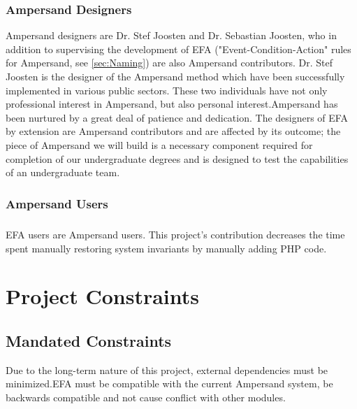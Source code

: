 \documentclass[12pt]{report}
\begin{document}
\subsection{Ampersand Designers}\label{subsec:Ampersand}
Ampersand designers are Dr. Stef Joosten and Dr. Sebastian Joosten, who in
addition to supervising the development of EFA ("Event-Condition-Action" rules
for Ampersand, see \ref{sec:Naming}) are also Ampersand
contributors.
Dr. Stef Joosten is the designer of the Ampersand method which
have been successfully implemented in various public sectors. These two 
individuals have not only professional interest in Ampersand, but also personal 
interest.Ampersand has been nurtured by a great deal of patience and
dedication. The designers of EFA by extension are Ampersand contributors and
are affected by its outcome; the piece of Ampersand we will build is a necessary
component required for completion of our undergraduate degrees and is designed 
to test the capabilities of an undergraduate team. 


\subsection{Ampersand Users}\label{subsec:BusReq}
\paragraph{}
EFA users are Ampersand users. This project's contribution  
decreases the time spent manually restoring system invariants by manually 
adding PHP code.  


\chapter{Project Constraints}\label{ch:Constraints}



\section{Mandated Constraints}\label{sec:Constraints}
Due to the long-term nature of this project, external dependencies must be 
minimized.EFA must be compatible with the current Ampersand system, be 
backwards compatible and not cause conflict with other modules.
\end{document}
